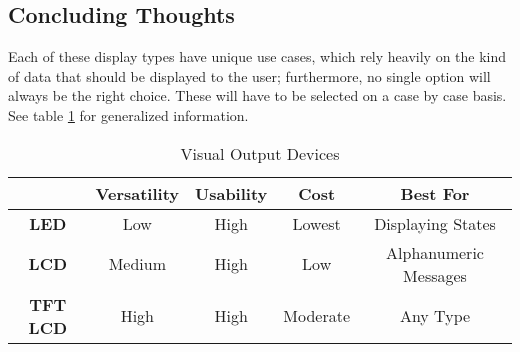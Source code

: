     \subsection{Concluding Thoughts}
        Each of these display types have unique use cases, which rely heavily on the kind of data that should be displayed to the user; furthermore, no single option will always be the right choice.
        These will have to be selected on a case by case basis. See table \ref{tbl:VOD} for generalized information.
        \begin{table}[!ht]
        \begin{center} 
        \caption{Visual Output Devices}
        \label{tbl:VOD}
            \begin{tabular}{| c | c | c | c | c |}
                \hline
                & Versatility & Usability & Cost & Best For \\ \hline
                \textbf{LED} & Low & High & Lowest & Displaying States \\ \hline
                \textbf{LCD} & Medium & High & Low & Alphanumeric Messages \\ \hline
                \textbf{TFT LCD} & High & High & Moderate & Any Type \\ \hline
            \end{tabular}
            
        \end{center}
        \end{table}            
